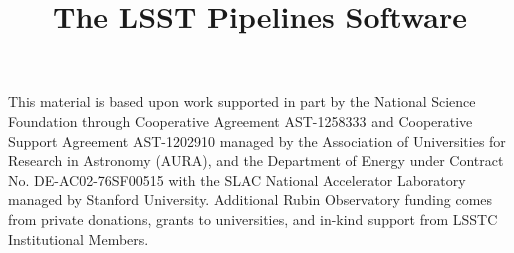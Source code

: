 \documentclass[twocolumn]{aastex62}
\begin{document}
\title{The LSST Pipelines Software}




















\acknowledgments
This material is based upon work supported in part by the National Science Foundation through Cooperative Agreement AST-1258333 and Cooperative Support Agreement AST-1202910 managed by the Association of Universities for Research in Astronomy (AURA), and the Department of Energy under Contract No. DE-AC02-76SF00515 with the SLAC National Accelerator Laboratory managed by Stanford University.
Additional Rubin Observatory funding comes from private donations, grants to universities, and in-kind support from LSSTC Institutional Members.



\end{document}
